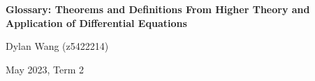 \documentclass{article}
\begin{document}
\begin{titlepage}
    \centering
    \vspace*{\fill}

    \vspace*{0.5cm}

    \huge\bfseries
    Glossary: Theorems and Definitions From Higher Theory and Application of Differential Equations

    \vspace*{2cm}

    \large Dylan Wang (z5422214)

    \vspace*{2cm}

    \large May 2023, Term 2

    \vspace*{\fill}
\end{titlepage}
\newpage
\end{document}
